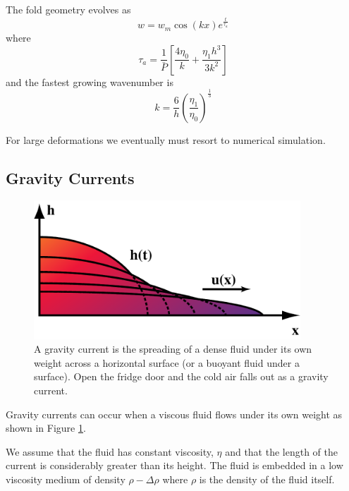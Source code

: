 \documentclass[10pt]{article}
\begin{document}
	The fold geometry evolves as
		\begin{equation}
			w=w_m \cos(kx) e^{\frac{t}{\tau_a}}
		\end{equation}
	where
		\begin{equation}
			\tau_a = \frac{1}{\bar{P}}\left[ \frac{4 \eta_0}{k} + \frac{\eta_1 h^3}{3k^2} \right]
		\end{equation}
	and the fastest growing wavenumber is
		\begin{equation}
			k = \frac{6}{h}\left( \frac{\eta_1}{\eta_0} \right)^{\frac{1}{3}}
		\end{equation}
	
	For large deformations we eventually must
	resort to numerical simulation.

	\subsection{Gravity Currents}
	
		\begin{figure}[h]
			\begin{center}
				\includegraphics[width=100mm]{Diagrams/gravcurr}
				\caption[]{A gravity current is the spreading of a dense
				fluid under its own weight across a horizontal surface (or
				a buoyant fluid under a surface). Open the fridge door and
				the cold air falls out as a gravity current.
				}
				\label{fig:gcurr1}
			\end{center}	
		\end{figure}
		
		Gravity currents can occur when a viscous fluid flows under its own weight
		as shown in Figure \ref{fig:gcurr1}. 
		
		We assume that the fluid has constant viscosity, $\eta$ and that
		the length of the current is considerably greater than its height. The fluid is embedded
		in a low viscosity medium of density $\rho-\Delta \rho$ where $\rho$ is the density
		of the fluid itself.
	
\end{document}
